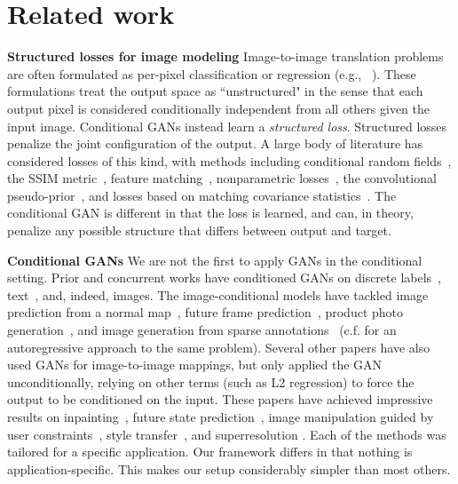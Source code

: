 \section{Related work}

{\bf Structured losses for image modeling} Image-to-image translation problems are often formulated as per-pixel classification or regression (e.g., ~\cite{long2015fully,xie2015holistically,iizuka2016let,larsson2016learning,zhang2016colorful}). These formulations treat the output space as ``unstructured" in the sense that each output pixel is considered conditionally independent from all others given the input image. Conditional GANs instead learn a \emph{structured loss}. Structured losses penalize the joint configuration of the output. A large body of literature has considered losses of this kind, with methods including conditional random fields~\cite{chen14semantic}, the SSIM metric~\cite{wang2004image}, feature matching~\cite{dosovitskiy2016generating}, nonparametric losses~\cite{li2016combining}, the convolutional pseudo-prior~\cite{xie2015convolutional}, and losses based on matching covariance statistics~\cite{johnson2016perceptual}. The conditional GAN is different in that the loss is learned, and can, in theory, penalize any possible structure that differs between output and target.

{\bf Conditional GANs} We are not the first to apply GANs in the conditional setting. Prior and concurrent works have conditioned GANs on discrete labels~\cite{mirza2014conditional,gauthier2014conditional,denton2015deep}, text~\cite{reed2016generative}, and, indeed, images. The image-conditional models have tackled image prediction from a normal map~\cite{wang2016generative}, future frame prediction~\cite{mathieu2015deep}, product photo generation~\cite{yoo2016pixel}, and image generation from sparse annotations~\cite{karacan2016learning,reed2016learning} (c.f. \cite{reed2016generating} for an autoregressive approach to the same problem). Several other papers have also used GANs for image-to-image mappings, but only applied the GAN unconditionally, relying on other terms (such as L2 regression) to force the output to be conditioned on the input. These papers have achieved impressive results on inpainting~\cite{pathak2016context}, future state prediction~\cite{zhou2016learning}, image manipulation guided by user constraints~\cite{zhu2016generative}, style transfer~\cite{li2016precomputed}, and superresolution \cite{ledig2016photo}. Each of the methods was tailored for a specific application. Our framework differs in that nothing is application-specific. This makes our setup considerably simpler than most others.

